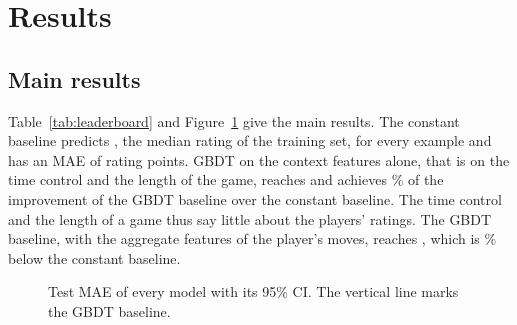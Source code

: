 \documentclass[11pt]{article}
\begin{document}
\section{Results}
\label{sec:results}

\subsection{Main results}

Table~\ref{tab:leaderboard} and Figure~\ref{fig:scores} give the main
results. The constant baseline predicts , the median rating
of the training set, for every example and has an MAE of 
rating points. GBDT on the context features alone, that is on the time
control and the length of the game, reaches  and
achieves \% of the improvement of the GBDT baseline
over the constant baseline. The time control and the length of a game thus
say little about the players' ratings. The GBDT baseline, with the
 aggregate features of the player's moves, reaches
, which is \% below the constant
baseline.

\begin{table}[htbp]\centering\small
{}
\caption{Main results on the  test examples, from
 games, best first. The gain is the paired difference in
MAE from  on the same resampled games. It is positive when
the model is better, and bold when statistically significant.}
\label{tab:leaderboard}
\end{table}

\begin{figure}[htbp]\centering
{}
\caption{Test MAE of every model with its 95\% CI. The vertical line marks
the GBDT baseline.}
\label{fig:scores}
\end{figure}
\end{document}
